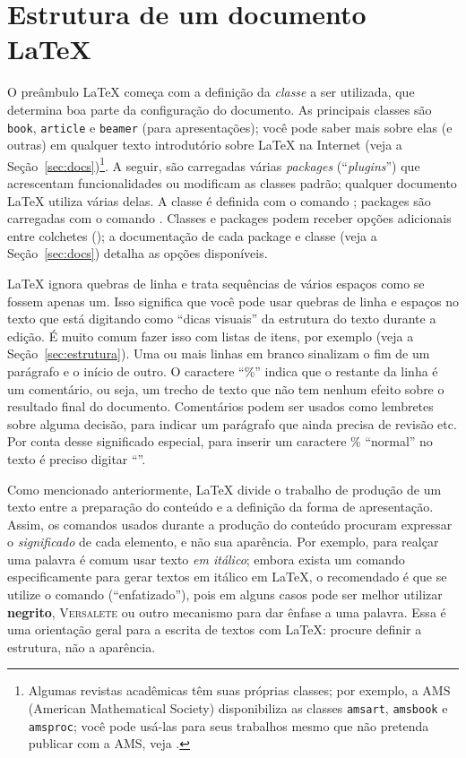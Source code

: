 \section{Estrutura de um documento \LaTeX{}}
\label{sec:basico}

\enlargethispage{.5\baselineskip}

O preâmbulo \LaTeX{} começa com a definição da \emph{classe} a ser utilizada,
que determina boa parte da configuração do documento. As principais classes
são \texttt{book}, \texttt{article} e \texttt{beamer} (para apresentações); você pode
saber mais sobre elas (e outras) em qualquer texto introdutório sobre \LaTeX{}
na Internet (veja a Seção~\ref{sec:docs})\footnote{Algumas revistas acadêmicas
têm suas próprias classes; por exemplo, a AMS (American Mathematical Society)
disponibiliza as classes \texttt{amsart}, \texttt{amsbook} e \texttt{amsproc}; você
pode usá-las para seus trabalhos mesmo que não pretenda publicar com a AMS,
veja .}. A seguir, são carregadas
várias \emph{packages} (``\emph{plugins}'') que acrescentam funcionalidades ou
modificam as classes padrão; qualquer documento \LaTeX{} utiliza várias delas.
A classe é definida com o comando ;
packages são carregadas com o comando .
Classes e packages podem receber opções adicionais entre colchetes
(); a documentação
de cada package e classe (veja a Seção~\ref{sec:docs}) detalha as opções
disponíveis.

\LaTeX{} ignora quebras de linha e trata sequências de vários espaços como
se fossem apenas um. Isso significa que você pode usar quebras de linha e
espaços no texto que está digitando como ``dicas visuais'' da estrutura do
texto durante a edição. É muito comum fazer isso com listas de itens, por
exemplo (veja a Seção~\ref{sec:estrutura}). Uma ou mais linhas em branco
sinalizam o fim de um parágrafo e o início de outro. O caractere ``\%''
indica que o restante da linha é um comentário, ou seja, um trecho de texto
que não tem nenhum efeito sobre o resultado final do documento. Comentários
podem ser usados como lembretes sobre alguma decisão, para indicar um
parágrafo que ainda precisa de revisão etc. Por conta desse significado
especial, para inserir um caractere \% ``normal'' no texto é preciso digitar
``\ltxcmd{\%}''.

Como mencionado anteriormente, \LaTeX{} divide o trabalho de produção
de um texto entre a preparação do conteúdo e a definição da forma de
apresentação. Assim, os comandos usados durante a produção do conteúdo
procuram expressar o \emph{significado} de cada elemento, e não sua
aparência. Por exemplo, para realçar uma palavra é comum usar texto
\textit{em itálico}; embora exista um comando especificamente para gerar
textos em itálico em \LaTeX{}, o recomendado é que se utilize o comando
 (``enfatizado''), pois em alguns casos pode ser melhor
utilizar \textbf{negrito}, \textsc{Versalete} ou outro mecanismo para
dar ênfase a uma palavra. Essa é uma orientação geral para a escrita de
textos com \LaTeX{}: procure definir a estrutura, não a aparência.


